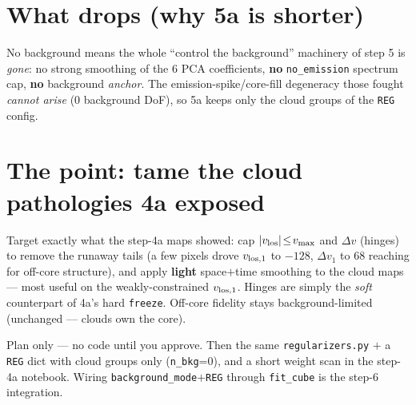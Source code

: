 \documentclass[10pt,a4paper]{article}
\newcommand{\co}[1]{{\small\texttt{#1}}}
\begin{document}
\section{What drops (why 5a is shorter)}

No background means the whole ``control the background'' machinery of step 5 is \emph{gone}: no strong smoothing of the 6 PCA coefficients, \textbf{no} \co{no\_emission} spectrum cap, \textbf{no} background \emph{anchor}. The emission-spike/core-fill degeneracy those fought \emph{cannot arise} (0 background DoF), so 5a keeps only the cloud groups of the \co{REG} config.

\section{The point: tame the cloud pathologies 4a exposed}

Target exactly what the step-4a maps showed: cap $|v_{\rm los}|\!\le\!v_{\max}$ and $\Delta v$ (hinges) to remove the runaway tails (a few pixels drove $v_{\rm los,1}$ to $-128$, $\Delta v_1$ to $68$ reaching for off-core structure), and apply \textbf{light} space$+$time smoothing to the cloud maps --- most useful on the weakly-constrained $v_{\rm los,1}$. Hinges are simply the \emph{soft} counterpart of 4a's hard \co{freeze}. Off-core fidelity stays background-limited (unchanged --- clouds own the core).

\vspace{1pt}{\footnotesize\color{gry}\rule{\textwidth}{0.4pt}}
{\sffamily\color{gry}\footnotesize Plan only --- no code until you approve. Then the same \co{regularizers.py} $+$ a \co{REG} dict with cloud groups only (\co{n\_bkg}=0), and a short weight scan in the step-4a notebook. Wiring \co{background\_mode}$+$\co{REG} through \co{fit\_cube} is the step-6 integration.}
\end{document}
